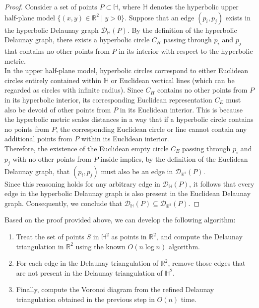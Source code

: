 \documentclass[minted, draw]{hebdomon}
\newcommand{\R}{{\mathbb{R} }}
\newcommand{\HH}{{\mathbb{H} }}
\begin{document}
\begin{proof}
Consider a set of points \( P \subset \HH \), where \( \HH \) denotes the hyperbolic upper half-plane model \( \{(x, y) \in \R^2 \mid y > 0\} \). Suppose that an edge \( (p_i, p_j) \) exists in the hyperbolic Delaunay graph \( \mathcal{D}_{\HH}(P) \). By the definition of the hyperbolic Delaunay graph, there exists a hyperbolic circle \( C_H \) passing through \( p_i \) and \( p_j \) that contains no other points from \( P \) in its interior with respect to the hyperbolic metric. \\

In the upper half-plane model, hyperbolic circles correspond to either Euclidean circles entirely contained within \( \HH \) or Euclidean vertical lines (which can be regarded as circles with infinite radius). Since \( C_H \) contains no other points from \( P \) in its hyperbolic interior, its corresponding Euclidean representation \( C_E \) must also be devoid of other points from \( P \) in its Euclidean interior. This is because the hyperbolic metric scales distances in a way that if a hyperbolic circle contains no points from \( P \), the corresponding Euclidean circle or line cannot contain any additional points from \( P \) within its Euclidean interior. \\

Therefore, the existence of the Euclidean empty circle \( C_E \) passing through \( p_i \) and \( p_j \) with no other points from \( P \) inside implies, by the definition of the Euclidean Delaunay graph, that \( (p_i, p_j) \) must also be an edge in \( \mathcal{D}_{\R^2}(P) \). \\

Since this reasoning holds for any arbitrary edge in \( \mathcal{D}_{\HH}(P) \), it follows that every edge in the hyperbolic Delaunay graph is also present in the Euclidean Delaunay graph. Consequently, we conclude that \( \mathcal{D}_{\HH}(P) \subseteq \mathcal{D}_{\R^2}(P) \).
\end{proof}


Based on the proof provided above, we can develop the following algorithm:
\begin{enumerate}
    \item Treat the set of points \( S \) in \( \HH^2 \) as points in \( \R^2 \), and compute the Delaunay triangulation in \( \R^2 \) using the known \( O(n \log n) \) algorithm.
    \item For each edge in the Delaunay triangulation of $\R^2$, remove those edges that are not present in the Delaunay triangulation of \( \HH^2 \).
    \item Finally, compute the Voronoi diagram from the refined Delaunay triangulation obtained in the previous step in \( O(n) \) time.
\end{enumerate}
\end{document}
